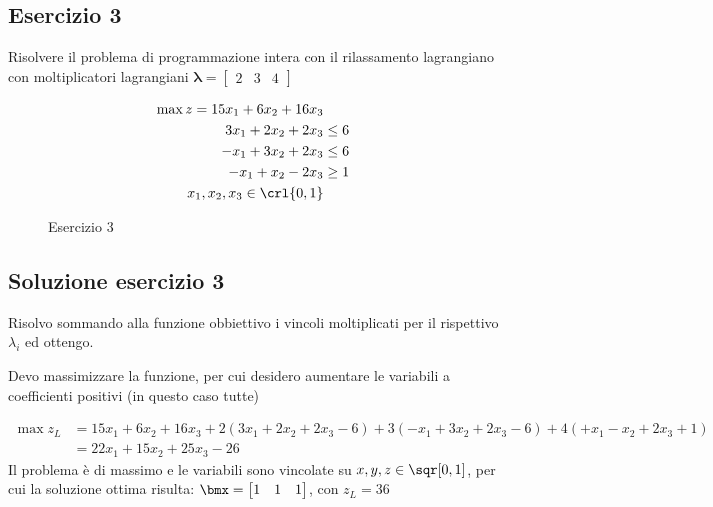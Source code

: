 \documentclass[\main/main.tex]{subfiles}
\begin{document}
\subsection{Esercizio 3}
Risolvere il problema di programmazione intera con il rilassamento lagrangiano con moltiplicatori lagrangiani $\bm{\lambda} = \begin{bmatrix}
		2 & 3 & 4
	\end{bmatrix}$

\begin{figure}
	\begin{align*}
		\max z = 15x_1 + 6x_2 + 16x_3 \\
		3x_1 + 2x_2 + 2x_3 & \leq 6   \\
		-x_1 + 3x_2 + 2x_3 & \leq 6   \\
		-x_1 + x_2 - 2x_3  & \geq 1   \\
		x_1, x_2, x_3 \in \crl{0,1}
	\end{align*}
	\caption{Esercizio 3}
\end{figure}

\subsection{Soluzione esercizio 3}
Risolvo sommando alla funzione obbiettivo i vincoli moltiplicati per il rispettivo $\lambda_i$ ed ottengo.

Devo massimizzare la funzione, per cui desidero aumentare le variabili a coefficienti positivi (in questo caso tutte)

\begin{align*}
	\max z_L & = 15x_1 + 6x_2 + 16x_3 +2(3x_1 + 2x_2 + 2x_3 - 6) + 3(-x_1 + 3x_2 + 2x_3 - 6) + 4(+x_1 - x_2 + 2x_3 + 1) \\
	         & = 22 x_1 + 15 x_2 + 25 x_3 - 26
\end{align*}
Il problema è di massimo e le variabili sono vincolate su $x,y,z \in \sqr[0,1]$, per cui la soluzione ottima risulta: $\bmx = \begin{bmatrix}
		1 & 1 & 1
	\end{bmatrix}$, con $z_L = 36$
\end{document}
